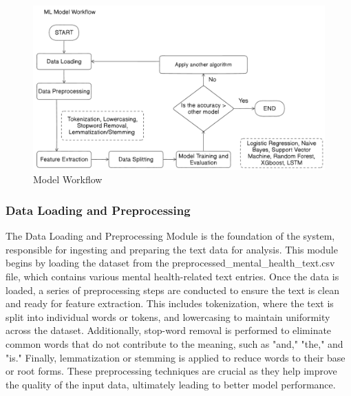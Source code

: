 \begin{figure}[h!]  
    \centering
    \includegraphics[width=1.0\textwidth]{Images/ML Model Workflow.png}  
    \caption{Model Workflow}
    \label{Model Workflow}  %
\end{figure}

\vspace{.1in}

\subsubsection{Data Loading and Preprocessing}
\noindent
The Data Loading and Preprocessing Module is the foundation of the system, responsible for ingesting and preparing the text data for analysis. This module begins by loading the dataset from the preprocessed\_mental\_health\_text.csv file, which contains various mental health-related text entries. Once the data is loaded, a series of preprocessing steps are conducted to ensure the text is clean and ready for feature extraction. This includes tokenization, where the text is split into individual words or tokens, and lowercasing to maintain uniformity across the dataset. Additionally, stop-word removal is performed to eliminate common words that do not contribute to the meaning, such as "and," "the," and "is." Finally, lemmatization or stemming is applied to reduce words to their base or root forms. These preprocessing techniques are crucial as they help improve the quality of the input data, ultimately leading to better model performance.

